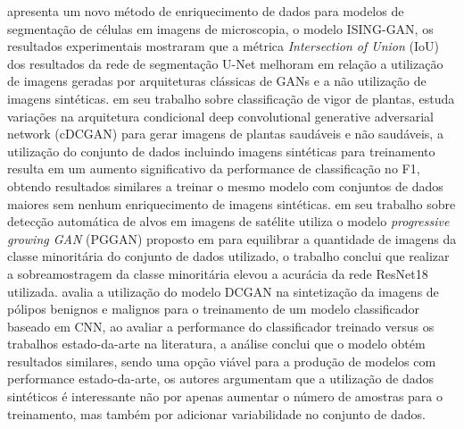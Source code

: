  apresenta um novo método de enriquecimento de dados para modelos de segmentação de células em imagens de microscopia, o modelo ISING-GAN, os resultados experimentais mostraram que a métrica \textit{Intersection of Union} (IoU) dos resultados da rede de segmentação U-Net melhoram em relação a utilização de imagens geradas por arquiteturas clássicas de GANs e a não utilização de imagens sintéticas.
 em seu trabalho sobre classificação de vigor de plantas, estuda variações na arquitetura condicional deep convolutional generative adversarial network (cDCGAN) para gerar imagens de plantas saudáveis e não saudáveis, a utilização do conjunto de dados incluindo imagens sintéticas para treinamento resulta em um aumento significativo da performance de classificação no F1, obtendo resultados similares a treinar o mesmo modelo com conjuntos de dados maiores sem nenhum enriquecimento de imagens sintéticas.
 em seu trabalho sobre detecção automática de alvos em imagens de satélite utiliza o modelo \textit{progressive growing GAN} (PGGAN) proposto em  para equilibrar a quantidade de imagens da classe minoritária do conjunto de dados utilizado, o trabalho conclui que realizar a sobreamostragem da classe minoritária elevou a acurácia da rede ResNet18 utilizada.
 avalia a utilização do modelo DCGAN na sintetização da imagens de pólipos benignos e malignos para o treinamento de um modelo classificador baseado em CNN, ao avaliar a performance do classificador treinado versus os trabalhos estado-da-arte na literatura, a análise conclui que o modelo obtém resultados similares, sendo uma opção viável para a produção de modelos com performance estado-da-arte, os autores argumentam que a utilização de dados sintéticos é interessante não por apenas aumentar o número de amostras para o treinamento, mas também por adicionar variabilidade no conjunto de dados.

